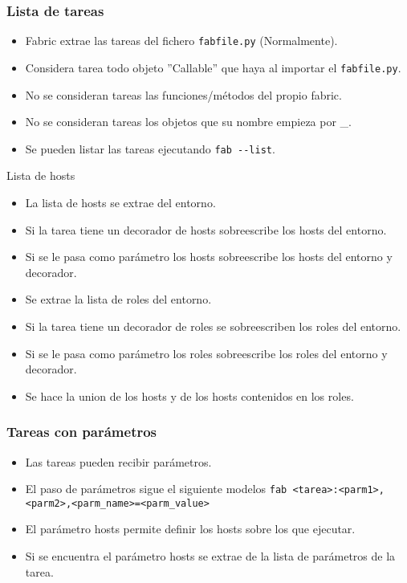 \documentclass[10pt]{beamer}
\begin{document}
  \begin{frame}[containsverbatim]
    \frametitle{Lista de tareas}
    \begin{itemize}
      \item Fabric extrae las tareas del fichero \verb+fabfile.py+ (Normalmente).
      \item Considera tarea todo objeto ''Callable'' que haya al importar el \verb+fabfile.py+.
      \item No se consideran tareas las funciones/métodos del propio fabric.
      \item No se consideran tareas los objetos que su nombre empieza por \_.
      \item Se pueden listar las tareas ejecutando \verb+fab --list+.
    \end{itemize}
  \end{frame}

  \begin{frame}{Lista de hosts}
    \begin{itemize}
      \item La lista de hosts se extrae del entorno.
      \item Si la tarea tiene un decorador de hosts sobreescribe los hosts del entorno.
      \item Si se le pasa como parámetro los hosts sobreescribe los hosts del entorno y decorador.
      \item Se extrae la lista de roles del entorno.
      \item Si la tarea tiene un decorador de roles se sobreescriben los roles del entorno.
      \item Si se le pasa como parámetro los roles sobreescribe los roles del entorno y decorador.
      \item Se hace la union de los hosts y de los hosts contenidos en los roles.
    \end{itemize}
  \end{frame}

  \begin{frame}[containsverbatim]
    \frametitle{Tareas con parámetros}
    \begin{itemize}
      \item Las tareas pueden recibir parámetros.
      \item El paso de parámetros sigue el siguiente modelos \verb+fab <tarea>:<parm1>,<parm2>,<parm_name>=<parm_value>+
      \item El parámetro hosts permite definir los hosts sobre los que ejecutar.
      \item Si se encuentra el parámetro hosts se extrae de la lista de parámetros de la tarea.
    \end{itemize}
  \end{frame}
  
\end{document}
